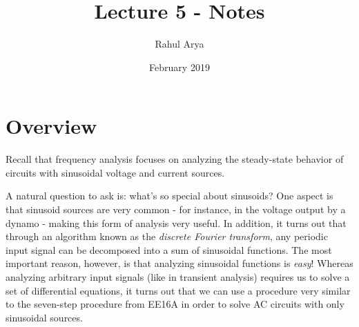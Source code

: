 \documentclass[letterpaper]{article}
\title{Lecture 5 - Notes}
\author{Rahul Arya}
\date{February 2019}
\theoremstyle{remark}
\begin{document}
\maketitle

\section{Overview}
Recall that frequency analysis focuses on analyzing the steady-state behavior of circuits with sinusoidal voltage and current sources.

A natural question to ask is: what's so special about sinusoids? One aspect is that sinusoid sources are very common - for instance, in the voltage output by a dynamo - making this form of analysis very useful. In addition, it turns out that through an algorithm known as the \emph{discrete Fourier transform}, any periodic input signal can be decomposed into a sum of sinusoidal functions. The most important reason, however, is that analyzing sinusoidal functions is \emph{easy}! Whereas analyzing arbitrary input signals (like in transient analysis) requires us to solve a set of differential equations, it turns out that we can use a procedure very similar to the seven-step procedure from EE16A in order to solve AC circuits with only sinusoidal sources.
\end{document}
